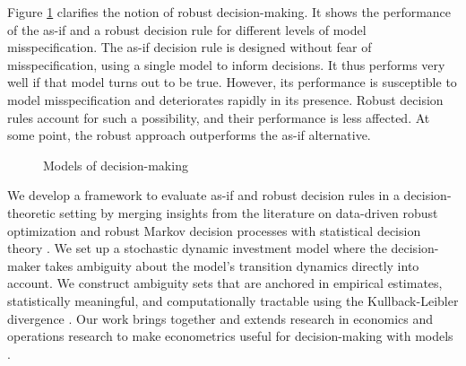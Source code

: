 {Figure \ref{Robust decisions}
 clarifies the notion of robust decision-making. It shows the performance of the as-if and a robust decision rule for different levels of model misspecification. The as-if decision rule is designed without fear of misspecification, using a single model to inform decisions. It thus performs very well if that model turns out to be true. However, its performance is susceptible to model misspecification and deteriorates rapidly in its presence. Robust decision rules account for such a possibility, and their performance is less affected. At some point, the robust approach outperforms the as-if alternative.\\
%
\begin{figure}[h!]\centering
	\caption{Models of decision-making}\label{Robust decisions}
\end{figure}%
%
We develop a framework to evaluate as-if and robust decision rules in a decision-theoretic setting by merging insights from the literature on data-driven robust optimization \cite{Bertsimas.2018} and robust Markov decision processes \cite{Ben-Tal.2009} with statistical decision theory \cite{Berger.2010}. We set up a stochastic dynamic investment model where the decision-maker takes ambiguity about the model's transition dynamics directly into account. We construct ambiguity sets that are anchored in empirical estimates, statistically meaningful, and computationally tractable \cite{Ben-Tal.2013} using the Kullback-Leibler divergence \cite{Kullback.1951}. Our work brings together and extends research in economics and operations research to make econometrics useful for decision-making with models \cite{Manski.2021,Bertsimas.2006}.\\

}
